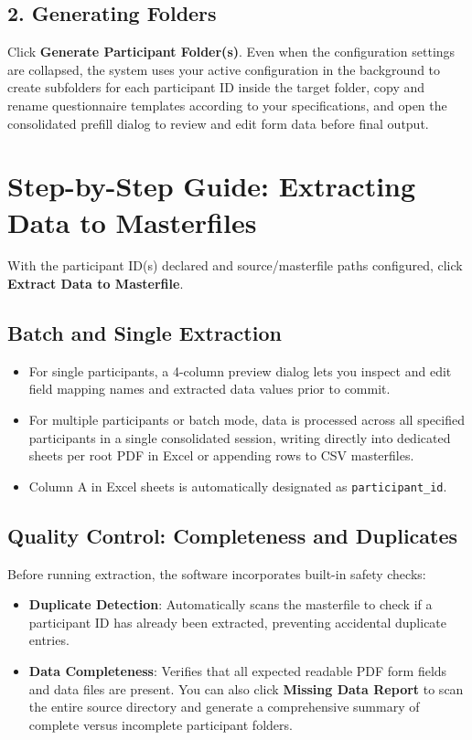 \documentclass[11pt,a4paper]{article}
\begin{document}
\subsection{2. Generating Folders}
Click \textbf{Generate Participant Folder(s)}. Even when the configuration settings are collapsed, the system uses your active configuration in the background to create subfolders for each participant ID inside the target folder, copy and rename questionnaire templates according to your specifications, and open the consolidated prefill dialog to review and edit form data before final output.

\section{Step-by-Step Guide: Extracting Data to Masterfiles}

With the participant ID(s) declared and source/masterfile paths configured, click \textbf{Extract Data to Masterfile}. 

\subsection{Batch and Single Extraction}
\begin{itemize}
    \item For single participants, a 4-column preview dialog lets you inspect and edit field mapping names and extracted data values prior to commit.
    \item For multiple participants or batch mode, data is processed across all specified participants in a single consolidated session, writing directly into dedicated sheets per root PDF in Excel or appending rows to CSV masterfiles.
    \item Column A in Excel sheets is automatically designated as \texttt{participant\_id}.
\end{itemize}

\subsection{Quality Control: Completeness and Duplicates}
Before running extraction, the software incorporates built-in safety checks:
\begin{itemize}
    \item \textbf{Duplicate Detection}: Automatically scans the masterfile to check if a participant ID has already been extracted, preventing accidental duplicate entries.
    \item \textbf{Data Completeness}: Verifies that all expected readable PDF form fields and data files are present. You can also click \textbf{Missing Data Report} to scan the entire source directory and generate a comprehensive summary of complete versus incomplete participant folders.
\end{itemize}
\end{document}
